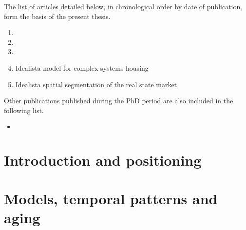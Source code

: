 \documentclass[
	10pt, %
	a4paper,
]{LegrandOrangeBook}
\begin{document}
The list of articles detailed below, in chronological order by date of publication, form the basis of the present thesis.
\vspace{0.5 cm}

\begin{enumerate}
	\item {}
	\vspace{0.5 cm}
	\item {}
	\vspace{0.5 cm}
	\item {}
	\vspace{0.5 cm}
	\item Idealista model for complex systems housing
	\vspace{0.5 cm}
	\item Idealista spatial segmentation of the real state market
	\vspace{0.5 cm}
\end{enumerate}

\vspace{0.5 cm}
Other publications published during the PhD period are also included in the following list.

\vspace{0.5 cm}
\begin{itemize}
	\item {}
	\vspace{0.5 cm}
\end{itemize}

\chapterspaceabove{6.75cm}
\chapterspacebelow{7.25cm}

\chapter{Introduction and positioning}


\chapterspaceabove{6.75cm}
\chapterspacebelow{7.25cm}

\chapter{Models, temporal patterns and aging}

\end{document}
